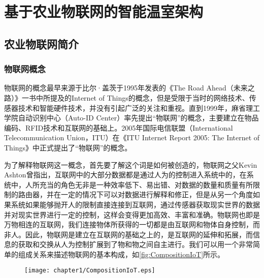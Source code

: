 
\chapter{基于农业物联网的智能温室架构}
\label{chapter:IoT Architecture}

\section{农业物联网简介}
	\subsection{物联网概念}
	物联网的概念最早来源于比尔·盖茨于1995年发表的《The Road Ahead（未来之路）》一书中所提及的Internet of Things的概念\supercite{TheRoadAhead}，但是受限于当时的网络技术、传感器技术和智能硬件技术，并没有引起广泛的关注和重视\supercite{NongYeWuLianWang}。直到1999年，麻省理工学院自动识别中心（Auto-ID Center）率先提出“物联网”的概念，主要建立在物品编码、RFID技术和互联网的基础上\supercite{ZiJiDongShouIoT}。2005年国际电信联盟（International Telecommunication Union，ITU）在《ITU Internet Report 2005: The Internet of Things》中正式提出了“物联网”的概念\supercite{2005ITU,NongYeWuLianWang}。
	
	为了解释物联网这一概念，首先要了解这个词是如何被创造的，物联网之父Kevin Ashton曾指出，互联网中的大部分数据都是通过人为的控制进入系统中的，在系统中，人所充当的角色无非是一种效率低下、易出错、对数据的数量和质量有所限制的路由器，并在一定的情况下可以对数据进行解释和修正，但是从另一个角度如果系统如果能够抛开人的限制直接连接到互联网，通过传感器获取现实世界的数据并对现实世界进行一定的控制，这样会变得更加高效、丰富和准确。物联网也即是万物相连的互联网，我们连接物体所获得的一切都是由互联网和物体自身控制，而非人\supercite{LearningIoT}。因此，物联网是建立在互联网的基础之上的，是互联网的延伸和拓展，而信息的获取和交换从人为控制扩展到了物和物之间自主进行。我们可以用一个非常简单的组成关系来描述物联网的基本构成，如\ref{fig:CompositionIoT}所示。
	\begin{figure}[!htp]
  		\centering
 		\texttt{[image: chapter1/CompositionIoT.eps]}
	\end{figure}
	
